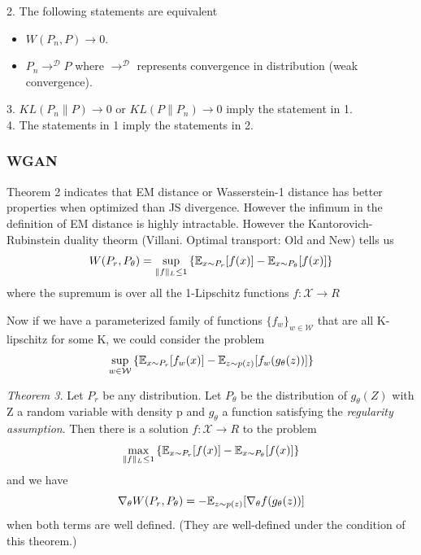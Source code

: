 \documentclass[english]{article}
\begin{document}
 2. The following statements are equivalent
 \begin{itemize}
  \item $W(P_n, P)\rightarrow 0$.
  \item $P_n \rightarrow^{\mathcal{D}} P$ where $\rightarrow^{\mathcal{D}}$ represents convergence in distribution (weak convergence).
  \end{itemize}


3. $KL(P_n\|P)\rightarrow 0$ or $KL(P\|P_n)\rightarrow 0$ imply the statement in 1.\\
4. The statements in 1 imply the statements in 2.


\eenum

\subsubsection{WGAN}
\benum



\item 
Theorem 2 indicates that EM distance or Wasserstein-1 distance has better properties when optimized than JS divergence. However the infimum in the definition of EM distance is highly intractable. However the Kantorovich-Rubinstein duality theorm (Villani. Optimal transport: Old and New) tells us 
$$W(P_r,P_\theta)= \sup_{\|f\|_L\le 1} {\{\mathbb{E}_{x\sim P_r}[f(x)]-\mathbb{E}_{x\sim P_\theta}[f(x)]\}}$$
where the supremum is over all the 1-Lipschitz functions $f: \mathcal{X}\rightarrow R$ 


\item 
Now if we have a parameterized family of functions $\{f_w\}_{w\in \mathcal{W}}$ that are all K-lipschitz for some K, we could consider the problem 
$$\sup_{w\in \mathcal{W}} {\{\mathbb{E}_{x\sim P_r}[f_w(x)]-\mathbb{E}_{z\sim p(z)}[f_w(g_\theta(z))]\}}$$






\item {\emph{Theorem 3.}}
Let $P_r$ be any distribution. Let $P_\theta$ be the distribution of $g_\theta(Z)$ with Z a random variable with density p and $g_\theta$ a function satisfying the \emph{regularity assumption}. Then there is a solution $f: \mathcal{X}\rightarrow R$ to the problem 
$$\max_{\|f\|_L \le 1} {\{\mathbb{E}_{x\sim P_r}[f(x)]-\mathbb{E}_{x\sim P_\theta}[f(x)]\}}$$
and we have
$$\nabla_\theta W(P_r,P_\theta)=-\mathbb{E}_{z\sim p(z)}[\nabla_\theta f(g_\theta(z))]$$
when both terms are well defined. (They are well-defined under the condition of this theorem.)
\end{document}

